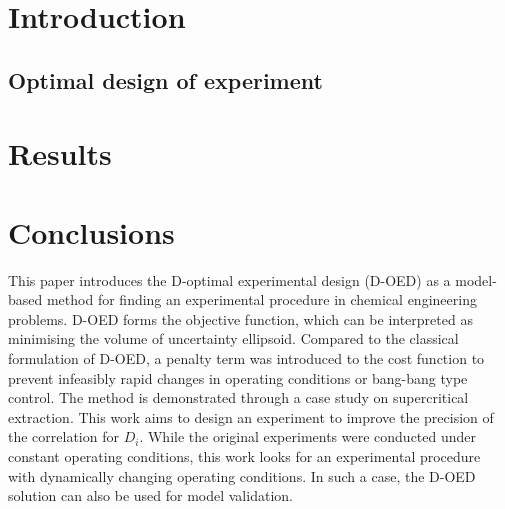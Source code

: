 \documentclass[a4paper,fleqn]{cas-dc}
\begin{document}
\maketitle


\section{Introduction}








\subsection{Optimal design of experiment} \label{CH: DOE}



\section{Results}


\section{Conclusions} \label{CH: Conclusion}
This paper introduces the D-optimal experimental design (D-OED) as a model-based method for finding an experimental procedure in chemical engineering problems. D-OED forms the objective function, which can be interpreted as minimising the volume of uncertainty ellipsoid. Compared to the classical formulation of D-OED, a penalty term was introduced to the cost function to prevent infeasibly rapid changes in operating conditions or bang-bang type control. The method is demonstrated through a case study on supercritical extraction. This work aims to design an experiment to improve the precision of the correlation for $D_i$. While the original experiments were conducted under constant operating conditions, this work looks for an experimental procedure with dynamically changing operating conditions. In such a case, the D-OED solution can also be used for model validation.
\end{document}
